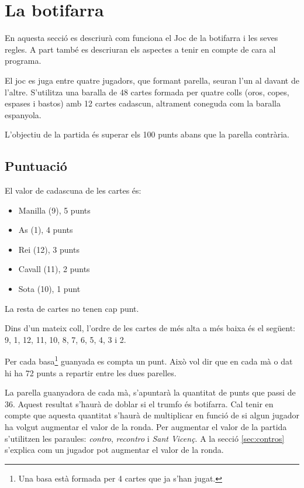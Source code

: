 \chapter{La botifarra}
\label{chap:botifarra}

En aquesta secció es descriurà com funciona el Joc de la botifarra i les seves regles. A part també es descriuran els aspectes a tenir en compte de cara al programa. 


El joc es juga entre quatre jugadors, que formant parella, seuran l'un al davant de l'altre. S'utilitza una baralla de 48 cartes formada per quatre colls (oros, copes, espases i bastos) amb 12 cartes cadascun, altrament coneguda com la baralla espanyola.


L'objectiu de la partida és superar els 100 punts abans que la parella contrària. 


\section{Puntuació}

El valor de cadascuna de les cartes és:
\begin{itemize}
	\item{Manilla (9), 5 punts}
    \item{As (1), 4 punts}
    \item{Rei (12), 3 punts}
    \item{Cavall (11), 2 punts}
    \item{Sota (10), 1 punt}
\end{itemize}

La resta de cartes no tenen cap punt.
    
Dins d'un mateix coll, l'ordre de les cartes de més alta a més baixa és el següent: 9, 1, 12, 11, 10, 8, 7, 6, 5, 4, 3 i 2.

Per cada basa\footnote{Una basa està formada per 4 cartes que ja s'han jugat.} guanyada es compta un punt. Això vol dir que en cada mà o dat hi ha 72 punts a repartir entre les dues parelles.

La parella guanyadora de cada mà, s'apuntarà la quantitat de punts que passi de 36. Aquest resultat s'haurà de doblar si el trumfo és botifarra. Cal tenir en compte que aquesta quantitat s'haurà de multiplicar en funció de si algun jugador ha volgut augmentar el valor de la ronda. Per augmentar el valor de la partida s'utilitzen les paraules: \emph{contro}, \emph{recontro} i \emph{Sant Vicenç}. A la secció \ref{sec:contros} s'explica com un jugador pot augmentar el valor de la ronda.

